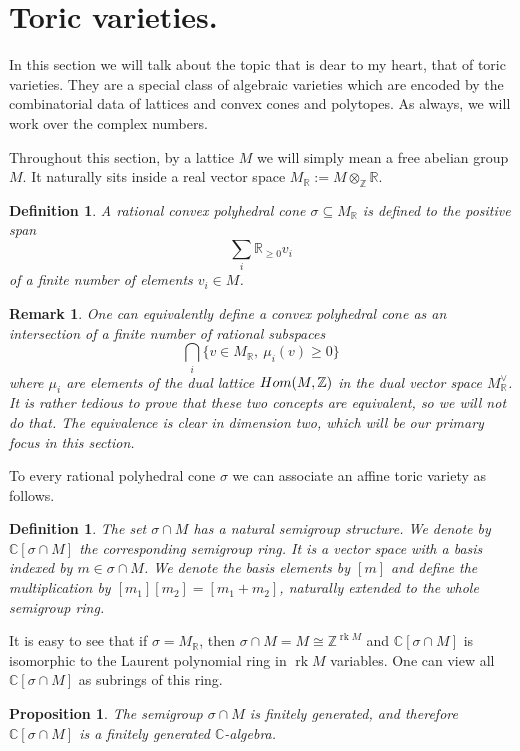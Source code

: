 \documentclass[11pt]{article}
\numberwithin{equation}{section}
\numberwithin{footnote}{section}
\newtheorem{prop}[thm]{Proposition}
\newtheorem{defn}[thm]{Definition}
\newtheorem{rem}[thm]{Remark}
\newcommand{\blue}{\color{blue}}
\newcommand{\R}{{\mathbb R}}
\newcommand{\Z}{{\mathbb Z}}
\newcommand{\C}{{\mathbb C}}
\DeclareMathOperator{\rk}{rk}
\begin{document}
\section{Toric varieties.}\label{sec.toric}
In this section we will talk about the topic that is dear to my heart, that of toric varieties. They are a special class of algebraic varieties which are encoded by the combinatorial data of lattices and convex cones and polytopes. As always, we will work over the complex numbers.

\smallskip
Throughout this section, by a lattice $M$ we will simply mean a free abelian group $M$. It naturally sits
inside a real vector space $M_\R:=M \otimes_\Z \R$.

\smallskip
\begin{defn}\label{ratcone}
A rational convex polyhedral cone $\sigma \subseteq M_\R$ is defined to the positive span
$$
\sum_i\R_{\geq 0} v_i
$$
of a finite number of elements $v_i\in M$.
\end{defn}

\smallskip
\begin{rem}
One can equivalently define a convex polyhedral cone as an intersection of a finite number of rational subspaces
$$
\bigcap_i\{v\in M_\R,~\mu_i(v)\geq 0\}
$$
where $\mu_i$ are elements of the dual lattice ${\rm Hom}(M,\Z)$ in the dual vector space $M_\R^\vee$. It is rather tedious to prove that these two concepts are equivalent, so we will not do that. The equivalence is clear in dimension two, which will be our primary focus in this section.
\end{rem}

\smallskip
To every rational polyhedral cone $\sigma$ we can associate an {\blue affine toric variety} as follows.

\smallskip
\begin{defn}
The set $\sigma \cap M$ has a natural semigroup structure. We denote by $\C[\sigma \cap M]$ the corresponding semigroup ring. It is a vector space with a basis indexed by $m\in \sigma \cap M$. We denote the basis elements by
$[m]$ and define the multiplication by $[m_1][m_2]=[m_1+m_2]$, naturally extended to the whole semigroup ring.
\end{defn}

It is easy to see that if $\sigma = M_\R$, then $\sigma\cap M=M\cong \Z^{\rk M}$ and $\C[\sigma\cap M]$ is isomorphic to the Laurent polynomial ring in $\rk M$ variables. One can view all $\C[\sigma\cap M]$ as subrings of this ring.

\smallskip
\begin{prop}
The semigroup $\sigma\cap M$ is finitely generated, and therefore $\C[\sigma \cap M]$ is a finitely generated $\C$-algebra.
\end{prop}
\end{document}

